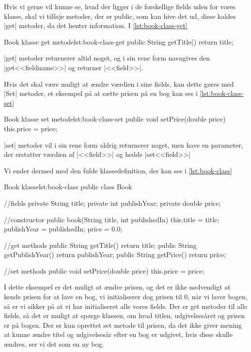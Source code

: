 Hvis vi gerne vil kunne se, hvad der ligger i de forskellige fields uden for vores klasse, skal vi tilføje metoder, der er public, som kan hive det ud, disse kaldes \JavaInline|get| metoder, da det henter information. I \autoref{lst:book-class-get}

\begin{JavaCode}{Book klasse get metode}{lst:book-class-get}
	public String getTitle() {
		return title;
	}
\end{JavaCode}

\JavaInline|get| metoder returnerer altid noget, og i sin rene form navngives den \JavaInline|get<<fieldname>>| og returner \JavaInline|<<field>>|.

Hvis det skal være muligt at ændre værdien i sine fields, kan dette gøres med \JavaInline|Set| metoder, et eksempel på at sætte prisen på en bog kan ses i \autoref{lst:book-class-set}

\begin{JavaCode}{Book klasse set metode}{lst:book-class-set}
	public void setPrice(double price) {
		this.price = price;
	}
\end{JavaCode}

\JavaInline|set| metoder vil i sin rene form aldrig returnerer noget, men have en parameter, der erstatter værdien af \JavaInline|<<field>>| og hedde \JavaInline|set<<field>>|

Vi ender dermed med den fulde klassedefinition, der kan ses i \autoref{lst:book-class}

\begin{JavaCode}{Book klasse}{lst:book-class}
	public class Book {
		//fields
		private String title;
		private int publishYear;
		private double price;
		
		//constructor
		public book(String title, int publishedIn) {
			this.title = title;
			publishYear = publishedIn;
			price = 0.0;
		}
	
		//get methods
		public String getTitle() {
			return title;
		}
		public String getPublishYear() {
			return publishYear;
		}
		public String getPrice() {
			return price;
		}
		
		//set methods
		public void setPrice(double price) {
			this.price = price;
		}
	}
\end{JavaCode}

I dette eksempel er det muligt at ændre prisen, og det er ikke nødvendigt at kende prisen for at lave en bog, vi initialiserer dog prisen til 0, når vi laver bogen, så er vi sikker på at vi har initialiseret alle vores fields. Der er get metoder til alle fields, så det er muligt at spørge klassen, om hvad titlen, udgivelsesåret og prisen er på bogen. Der er kun oprettet set metode til prisen, da det ikke giver mening at kunne ændre titel og udgivelsesår efter en bog er udgivet, hvis disse skulle ændres, ser vi det som en ny bog.

